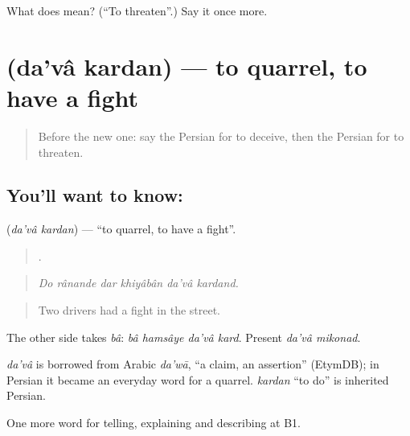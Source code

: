 \begin{tcolorbox}[breakable,colback=teal!4,colframe=teal!35!black,title={Before you move on}]
What does   mean? (\textquotedblleft{}To threaten\textquotedblright{}.) Say it once more.
\end{tcolorbox}
\section[\texorpdfstring{\fa{دعوا} \fa{کردن} (da'vâ kardan)}{دعوا کردن (da'vâ kardan)}]{  (da'vâ kardan) — to quarrel, to have a fight}

\label{lesson:FA-C323-dava-kardan}



\begin{quote}
Before the new one: say the Persian for to deceive, then the Persian for to threaten.
\end{quote}

\subsection*{You'll want to know:  }
\textbf{ } (\emph{da'vâ kardan}) — \textquotedblleft{}to quarrel, to have a fight\textquotedblright{}.

\begin{quote}
     .
\end{quote}

\begin{quote}
\emph{Do rânande dar khiyâbân da'vâ kardand.}
\end{quote}

\begin{quote}
Two drivers had a fight in the street.
\end{quote}

The other side takes \emph{bâ}: \emph{bâ hamsâye da'vâ kard}. Present \emph{da'vâ mikonad}.

\begin{cousinweb}
\emph{da'vâ} is borrowed from Arabic \emph{da'wā}, \textquotedblleft{}a claim, an assertion\textquotedblright{} (EtymDB); in Persian it became an everyday word for a quarrel. \emph{kardan} \textquotedblleft{}to do\textquotedblright{} is inherited Persian.
\end{cousinweb}

\begin{grammarlens}[title={What you've built}]
One more word for telling, explaining and describing at B1.
\end{grammarlens}

